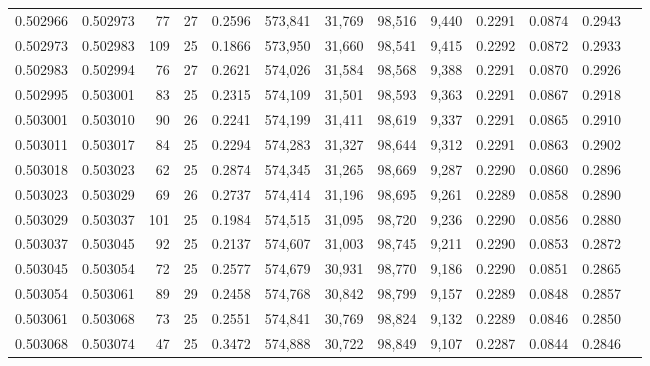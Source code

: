 \begin{tabular}{rrrrrrrrrrrrr}
0.502966 & 0.502973 &  77 &  27 &                                     0.2596 & 573,841 &  31,769 &  98,516 &   9,440 & 0.2291 & 0.0874 & 0.2943 \\
0.502973 & 0.502983 & 109 &  25 &                                     0.1866 & 573,950 &  31,660 &  98,541 &   9,415 & 0.2292 & 0.0872 & 0.2933 \\
0.502983 & 0.502994 &  76 &  27 &                                     0.2621 & 574,026 &  31,584 &  98,568 &   9,388 & 0.2291 & 0.0870 & 0.2926 \\
0.502995 & 0.503001 &  83 &  25 &                                     0.2315 & 574,109 &  31,501 &  98,593 &   9,363 & 0.2291 & 0.0867 & 0.2918 \\
0.503001 & 0.503010 &  90 &  26 &                                     0.2241 & 574,199 &  31,411 &  98,619 &   9,337 & 0.2291 & 0.0865 & 0.2910 \\
0.503011 & 0.503017 &  84 &  25 &                                     0.2294 & 574,283 &  31,327 &  98,644 &   9,312 & 0.2291 & 0.0863 & 0.2902 \\
0.503018 & 0.503023 &  62 &  25 &                                     0.2874 & 574,345 &  31,265 &  98,669 &   9,287 & 0.2290 & 0.0860 & 0.2896 \\
0.503023 & 0.503029 &  69 &  26 &                                     0.2737 & 574,414 &  31,196 &  98,695 &   9,261 & 0.2289 & 0.0858 & 0.2890 \\
0.503029 & 0.503037 & 101 &  25 &                                     0.1984 & 574,515 &  31,095 &  98,720 &   9,236 & 0.2290 & 0.0856 & 0.2880 \\
0.503037 & 0.503045 &  92 &  25 &                                     0.2137 & 574,607 &  31,003 &  98,745 &   9,211 & 0.2290 & 0.0853 & 0.2872 \\
0.503045 & 0.503054 &  72 &  25 &                                     0.2577 & 574,679 &  30,931 &  98,770 &   9,186 & 0.2290 & 0.0851 & 0.2865 \\
0.503054 & 0.503061 &  89 &  29 &                                     0.2458 & 574,768 &  30,842 &  98,799 &   9,157 & 0.2289 & 0.0848 & 0.2857 \\
0.503061 & 0.503068 &  73 &  25 &                                     0.2551 & 574,841 &  30,769 &  98,824 &   9,132 & 0.2289 & 0.0846 & 0.2850 \\
0.503068 & 0.503074 &  47 &  25 &                                     0.3472 & 574,888 &  30,722 &  98,849 &   9,107 & 0.2287 & 0.0844 & 0.2846 \\

\end{tabular}
